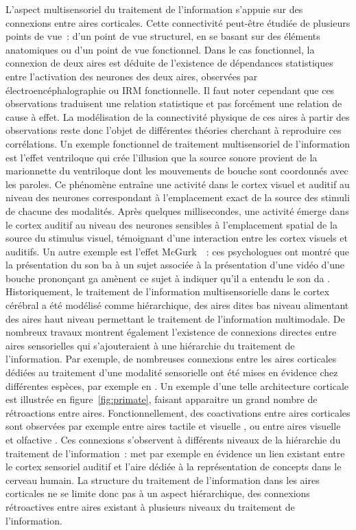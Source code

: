 \documentclass[../main]{subfiles}
\begin{document}
L'aspect multisensoriel du traitement de l'information s'appuie sur des connexions entre aires corticales.
Cette connectivité peut-être étudiée de plusieurs points de vue~: d'un point de vue structurel, en se basant sur des éléments anatomiques ou d'un point de vue fonctionnel.
Dans le cas fonctionnel, la connexion de deux aires est déduite de l'existence de dépendances statistiques entre l'activation des neurones des deux aires, observées par électroencéphalographie ou IRM fonctionnelle. Il faut noter cependant que ces observations traduisent une relation statistique et pas forcément une relation de cause à effet. 
La modélisation de la connectivité physique de ces aires à partir des observations reste donc l'objet de différentes théories cherchant à reproduire ces corrélations. 
Un exemple fonctionnel de traitement multisensoriel de l'information est l'effet ventriloque \parencite{Bonath2007NeuralBO} qui crée l'illusion que la source sonore provient de la marionnette du ventriloque dont les mouvements de bouche sont coordonnés avec les paroles. 
Ce phénomène entraîne une activité dans le cortex visuel et auditif au niveau des neurones correspondant à l'emplacement exact de la source des stimuli de chacune des modalités.
Après quelques millisecondes, une activité émerge dans le cortex auditif au niveau des neurones sensibles à l'emplacement spatial de la source du stimulus visuel, témoignant d'une interaction entre les cortex visuels et auditifs.
Un autre exemple est l'effet McGurk~\parencite{McGurk1976HearingLA}~: ces psychologues ont montré que la présentation du son \og ba \fg{} à un sujet associée à la présentation d'une vidéo d'une bouche prononçant \og ga \fg{} amènent ce sujet à indiquer qu'il a entendu le son \og da \fg{}.
Historiquement, le traitement de l'information multisensorielle dans le cortex cérébral a été modélisé comme hiérarchique, des aires dites bas niveau alimentant des aires haut niveau permettant le traitement de l'information multimodale. 
De nombreux travaux montrent également l'existence de connexions directes entre aires sensorielles qui s'ajouteraient à une hiérarchie du traitement de l'information. Par exemple, de nombreuses connexions entre les aires corticales dédiées au traitement d'une modalité sensorielle ont été mises en évidence chez différentes espèces, par exemple en \cite{primate_cortex_91,Calvert2004MultisensoryIM, Cappe2009MultisensoryAP,Foxe2005TheCF,Schroeder2005MultisensoryCT}. Un exemple d'une telle architecture corticale est illustrée en figure~\ref{fig:primate}, faisant apparaitre un grand nombre de rétroactions entre aires.
Fonctionnellement, des coactivations entre aires corticales sont observées par exemple entre aires tactile et visuelle \parencite{Sathian2002FeelingWT}, ou entre aires visuelle et olfactive \parencite{Gonzlez2006ReadingCA}.
Ces connexions s'observent à différents niveaux de la hiérarchie du traitement de l'information~: \cite{Kiefer2008TheSO} met par exemple en évidence un lien existant entre le cortex sensoriel auditif et l'aire dédiée à la représentation de concepts dans le cerveau humain.
La structure du traitement de l'information dans les aires corticales ne se limite donc pas à un aspect hiérarchique, des connexions rétroactives entre aires existant à plusieurs niveaux du traitement de l'information.
\end{document}
